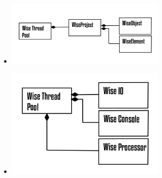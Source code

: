 \documentclass[10pt]{beamer}
\theoremstyle{remark}
\theoremstyle{definition}
\begin{document}
\begin{frame}[allowframebreaks]
\begin{itemize}
	\end{itemize}

	\framebreak
	\begin{itemize}
	
	\item \includegraphics[width=0.6\textwidth]{images/Prancheta 14@4x.png}
	
	\end{itemize}

	\framebreak
	\begin{itemize}
	
	\item \includegraphics[width=0.6\textwidth]{images/Prancheta 15@4x.png}
	
	\end{itemize}
	
\end{frame}
\end{document}
